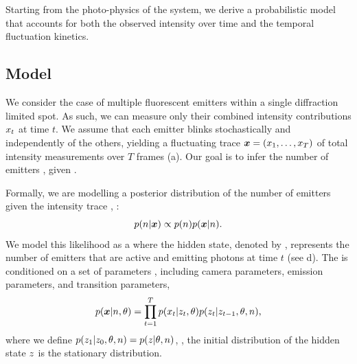 \section{}

Starting from the photo-physics of the system, we derive a probabilistic model
that accounts for both the observed intensity over time and the temporal fluctuation
kinetics.

\subsection{Model}

We consider the case of multiple fluorescent emitters within a single
diffraction limited spot.
%
  As such, we can measure only their combined intensity contributions
  $x_{t}$ at time $t$.
  We assume that each emitter blinks stochastically and independently of the
  others, yielding a fluctuating trace $\bm{x} = (x_{1},\ldots,x_{T})$ of total
  intensity measurements over $T$ frames (a).
  Our goal is to infer the number of emitters \n, given \trace.

Formally, we are modelling a posterior distribution of the
number of emitters \n given the intensity trace \trace, \ie:
  \begin{equation*}
    p(n | \bm{x}) \propto p(n) p(\bm{x} | n)
    \text{.}
  \end{equation*}
  We model this likelihood as a \hmm where the hidden state, denoted by ,
  represents the number of emitters that are active and emitting photons at
  time $t$ (see d).
  The \hmm is conditioned on a set of parameters \parameters, including
    \parametersc camera parameters, \parameterse emission parameters, 
    and \parameterst transition parameters,
  \begin{equation}
    p(\bm{x}| n, \theta) =
      \prod_{t=1}^{T}
        p(x_{t} | z_{t}, \theta)
        p(z_{t} | z_{t-1}, \theta, n)
    \text{,}
    \label{eq:method:HMM}
  \end{equation}
  where we define $p(z_{1}|z_{0},\theta,n)=p(z_{}|\theta,n)$, \ie,
  the initial distribution of the hidden state $z_{}$ is the stationary
  distribution.

